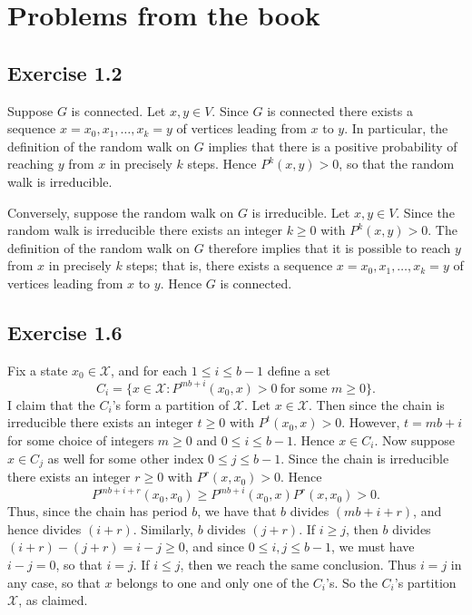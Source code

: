 \documentclass[12pt]{article}
\begin{document}
\section*{Problems from the book}

\subsection*{Exercise 1.2}

Suppose $G$ is connected. Let $x, y \in V$. Since $G$ is connected there exists a sequence $x = x_0, x_1, \ldots, x_k = y$ of vertices leading from $x$ to $y$. In particular, the definition of the random walk on $G$ implies that there is a positive probability of reaching $y$ from $x$ in precisely $k$ steps. Hence $P^k(x, y) > 0$, so that the random walk is irreducible.

Conversely, suppose the random walk on $G$ is irreducible. Let $x, y \in V$. Since the random walk is irreducible there exists an integer $k \geq 0$ with $P^k(x, y) > 0$. The definition of the random walk on $G$ therefore implies that it is possible to reach $y$ from $x$ in precisely $k$ steps; that is, there exists a sequence $x = x_0, x_1, \ldots, x_k = y$ of vertices leading from $x$ to $y$. Hence $G$ is connected.

\subsection*{Exercise 1.6}

Fix a state $x_0 \in \mathcal{X}$, and for each $1 \leq i \leq b - 1$ define a set
\begin{equation*}
C_i = \{x \in \mathcal{X} : P^{mb + i}(x_0, x) > 0 \ \text{for some $m \geq 0$}\}.
\end{equation*}
I claim that the $C_i$'s form a partition of $\mathcal{X}$. Let $x \in \mathcal{X}$. Then since the chain is irreducible there exists an integer $t \geq 0$ with $P^t(x_0, x) > 0$. However, $t = mb + i$ for some choice of integers $m \geq 0$ and $0 \leq i \leq b - 1$. Hence $x \in C_i$. Now suppose $x \in C_j$ as well for some other index $0 \leq j \leq b - 1$. Since the chain is irreducible there exists an integer $r \geq 0$ with $P^r(x, x_0) > 0$. Hence
\begin{equation*}
P^{mb+i+r}(x_0, x_0) \geq P^{mb+i}(x_0, x) P^r(x, x_0) > 0.
\end{equation*}
Thus, since the chain has period $b$, we have that $b$ divides $(mb+i+r)$, and hence divides $(i+r)$. Similarly, $b$ divides $(j+r)$. If $i \geq j$, then $b$ divides $(i+r) - (j+r) = i-j \geq 0$, and since $0 \leq i, j \leq b - 1$, we must have $i - j = 0$, so that $i = j$. If $i \leq j$, then we reach the same conclusion. Thus $i = j$ in any case, so that $x$ belongs to one and only one of the $C_i$'s. So the $C_i$'s partition $\mathcal{X}$, as claimed.
\end{document}
